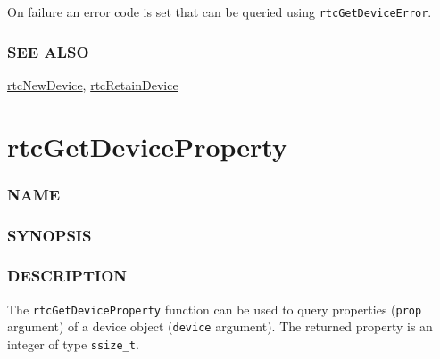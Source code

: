 On failure an error code is set that can be queried using
\texttt{rtcGetDeviceError}.

\subsubsection{SEE ALSO}\label{see-also}

\hyperref[rtcnewdevice]{rtcNewDevice},
\hyperref[rtcretaindevice]{rtcRetainDevice}

\pagebreak

\section{rtcGetDeviceProperty}\label{rtcgetdeviceproperty}

\subsubsection{NAME}\label{name}

\begin{Shaded}
\begin{Highlighting}[]
\OperatorTok{{-}}
\end{Highlighting}
\end{Shaded}

\subsubsection{SYNOPSIS}\label{synopsis}

\begin{Shaded}
\begin{Highlighting}[]

\OperatorTok{(}
\OperatorTok{,}
\OperatorTok{);}
\end{Highlighting}
\end{Shaded}

\subsubsection{DESCRIPTION}\label{description}

The \texttt{rtcGetDeviceProperty} function can be used to query
properties (\texttt{prop} argument) of a device object (\texttt{device}
argument). The returned property is an integer of type
\texttt{ssize\_t}.


